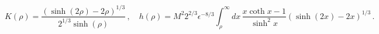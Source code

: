 \begin{equation}
K(\rho) = \frac{\left(\sinh(2\rho)-2\rho\right)^{1/3}}{2^{1/3}\sinh(\rho)}\,,\quad
h(\rho)= M^2 2^{2/3} \epsilon^{-8/3} \int_\rho^\infty dx\,
\frac{x \coth x -1}{\sinh^2 x} \left(\sinh(2 x)- 2 x\right)^{1/3}\,.
\end{equation}


